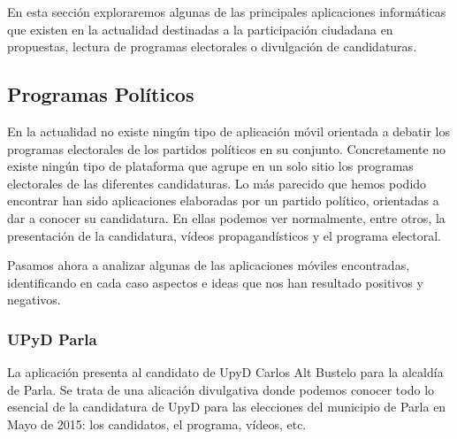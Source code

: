 En esta sección exploraremos algunas de las principales aplicaciones informáticas que existen en la actualidad destinadas a la participación ciudadana en propuestas, lectura de programas electorales o divulgación de candidaturas.

\subsection{Programas Políticos}

En la actualidad no existe ningún tipo de aplicación móvil orientada a debatir los programas electorales de los partidos políticos en su conjunto. Concretamente no existe ningún tipo de plataforma que agrupe en un solo sitio los programas electorales de las diferentes candidaturas.
Lo más parecido que hemos podido encontrar han sido aplicaciones elaboradas por un partido político, orientadas a dar a conocer su candidatura. En ellas podemos ver normalmente, entre otros, la presentación de la candidatura, vídeos propagandísticos y el programa electoral. 

Pasamos ahora a analizar algunas de las aplicaciones móviles encontradas, identificando en cada caso aspectos e ideas que nos han resultado positivos y negativos.

\subsubsection{UPyD Parla}
La aplicación presenta al candidato de UpyD Carlos Alt Bustelo para la alcaldía de Parla. Se trata de una alicación divulgativa donde podemos conocer todo lo esencial de la candidatura de UpyD para las elecciones del municipio de Parla en Mayo de 2015: los candidatos, el programa, vídeos, etc.

